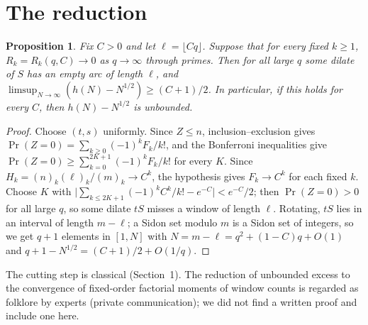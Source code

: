 \documentclass[11pt]{article}
\newtheorem{proposition}{Proposition}
\begin{document}
\section{The reduction}\label{sec:red}
\begin{proposition}\label{prop:red}
Fix $C>0$ and let $\ell=\lfloor Cq\rfloor$. Suppose that for every fixed $k\ge1$, $R_k=R_k(q,C)\to0$ as $q\to\infty$ through primes.
Then for all large $q$ some dilate of $S$ has an empty arc of length $\ell$, and $\limsup_{N\to\infty}(h(N)-N^{1/2})\ge(C+1)/2$.
In particular, if this holds for every $C$, then $h(N)-N^{1/2}$ is unbounded.
\end{proposition}
\begin{proof}
Choose $(t,s)$ uniformly. Since $Z\le n$, inclusion--exclusion gives $\Pr(Z=0)=\sum_{k\ge0}(-1)^kF_k/k!$, and the Bonferroni
inequalities give $\Pr(Z=0)\ge\sum_{k=0}^{2K+1}(-1)^kF_k/k!$ for every $K$. Since $H_k=(n)_k(\ell)_k/(m)_k\to C^k$, the hypothesis gives
$F_k\to C^k$ for each fixed $k$. Choose $K$ with $\bigl|\sum_{k\le2K+1}(-1)^kC^k/k!-e^{-C}\bigr|<e^{-C}/2$; then $\Pr(Z=0)>0$ for all
large $q$, so some dilate $tS$ misses a window of length $\ell$. Rotating, $tS$ lies in an interval of length $m-\ell$; a Sidon set
modulo $m$ is a Sidon set of integers, so we get $q+1$ elements in $[1,N]$ with $N=m-\ell=q^2+(1-C)q+O(1)$ and
$q+1-N^{1/2}=(C+1)/2+O(1/q)$.
\end{proof}
The cutting step is classical (Section~1). The reduction of unbounded excess to the convergence of fixed-order factorial moments of
window counts is regarded as folklore by experts (private communication); we did not find a written proof and include one here.
\end{document}
